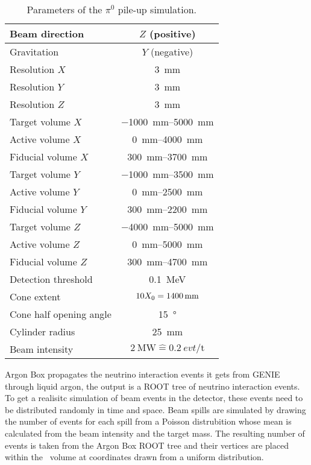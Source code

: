 \begin{table}[htb]
	\centering
	\caption{Parameters of the $\pi^0$ pile-up simulation.}
	\label{tab:dune-nd_pile-up-params}
	\begin{tabu} to \textwidth {|l|S|}
		\hline
		{Beam direction} &			{$Z$ (positive)} \\
		\hline
		{Gravitation} &				{$Y$ (negative)} \\
		\hline
		{Resolution $X$} &			\SI{3}{\milli\metre} \\
		\hline
		{Resolution $Y$} &			\SI{3}{\milli\metre} \\
		\hline
		{Resolution $Z$} &			\SI{3}{\milli\metre} \\
		\hline
		{Target volume $X$} &		\SIrange{-1000}{5000}{\milli\metre} \\
		\hline
		{Active volume $X$} &		\SIrange{0}{4000}{\milli\metre} \\
		\hline
		{Fiducial volume $X$} &		\SIrange{300}{3700}{\milli\metre} \\
		\hline
		{Target volume $Y$} &		\SIrange{-1000}{3500}{\milli\metre} \\
		\hline
		{Active volume $Y$} &		\SIrange{0}{2500}{\milli\metre} \\
		\hline
		{Fiducial volume $Y$} &		\SIrange{300}{2200}{\milli\metre} \\
		\hline
		{Target volume $Z$} &		\SIrange{-4000}{5000}{\milli\metre} \\
		\hline
		{Active volume $Z$} &		\SIrange{0}{5000}{\milli\metre} \\
		\hline
		{Fiducial volume $Z$} &		\SIrange{300}{4700}{\milli\metre} \\
		\hline
		{Detection threshold} &		\SI{0.1}{\mega\electronvolt} \\
		\hline
		{Cone extent} &				{$10 X_{\mathrm{0}} = \SI{1400}{\milli\metre}$} \\
		\hline
		{Cone half opening angle} &	\SI{15}{\degree} \\
		\hline
		{Cylinder radius} &			\SI{25}{\milli\metre} \\
		\hline
		{Beam intensity} &			{$\SI{2}{\mega\watt} \widehat{=} \SI{0.2}{evt\per\tonne}$} \\
		\hline
	\end{tabu}
\end{table}

Argon Box propagates the neutrino interaction events it gets from GENIE through liquid argon, the output is a ROOT tree of neutrino interaction events.
To get a realisitc simulation of beam events in the detector, these events need to be distributed randomly in time and space.
Beam spills are simulated by drawing the number of events for each spill from a Poisson distrubition whose mean is calculated from the beam intensity and the target mass.
The resulting number of events is taken from the Argon Box ROOT tree and their vertices are placed within the \lar\ volume at coordinates drawn from a uniform distribution.

